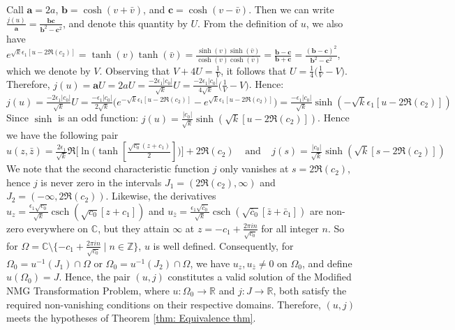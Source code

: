 \documentclass[12pt]{article}
\theoremstyle{plain}
\theoremstyle{definition}
\theoremstyle{remark}
\begin{document}
 Call \(\mathbf{a} = 2a\), \(\mathbf{b} = \cosh(v + \bar{v})\), and \(\mathbf{c} = \cosh(v - \bar{v})\). Then we can write \(\tfrac{j(u)}{\mathbf{a}} = \tfrac{\mathbf{b}\mathbf{c}}{\mathbf{b}^2 - \mathbf{c}^2}\), and denote this quantity by \(U\). From the definition of \(u\), we also have \(e^{\sqrt{k}\epsilon_1[u - 2\Re(c_2)]} = \tanh(v)\tanh(\bar{v}) = \tfrac{\sinh(v)\sinh(\bar{v})}{\cosh(v)\cosh(\bar{v})} = \tfrac{\mathbf{b} - \mathbf{c}}{\mathbf{b} + \mathbf{c}} = \tfrac{(\mathbf{b} - \mathbf{c})^2}{\mathbf{b}^2 - \mathbf{c}^2}\), which we denote by \(V\). Observing that \(V + 4U = \tfrac{1}{V}\), it follows that \(U = \tfrac{1}{4}\big(\tfrac{1}{V} - V\big)\). Therefore, \(j(u) = \mathbf{a}U = 2aU = \tfrac{-2\epsilon_1|c_0|}{\sqrt{k}}U = \tfrac{-2\epsilon_1|c_0|}{4\sqrt{k}}\big(\tfrac{1}{V} - V\big)\). Hence:
 \[
   j(u)=\tfrac{-2\epsilon_1|c_0|}{\sqrt{k}}U=\tfrac{-\epsilon_1|c_0|}{2\sqrt{k}}\big(e^{-\sqrt k\epsilon_1[u-2\Re(c_2)]}-e^{\sqrt k\epsilon_1[u-2\Re(c_2)]}\big)=\tfrac{-\epsilon_1|c_0|}{\sqrt{k}}\sinh(-\sqrt k\epsilon_1[u-2\Re(c_2)])
 \]
 Since \(\sinh\) is an odd function: \(j(u)=\tfrac{|c_0|}{\sqrt{k}}\sinh(\sqrt k[u-2\Re(c_2)])\). Hence we have the following pair
 \[
 \boxed{u(z,\bar z)=\tfrac{2\epsilon_1}{\sqrt{k}} \Re\Big[\ln\big(\tanh[\tfrac{\sqrt{c_0}(z + c_1)}{2}]\big)\Big] + 2\Re(c_2)}\;\;\;\;\text{and}\;\;\;\;\boxed{j(s)=\tfrac{|c_0|}{\sqrt{k}}\sinh(\sqrt k[s-2\Re(c_2)])}
 \]
 We note that the second characteristic function $j$ only vanishes at $s=2\Re(c_2)$, hence $j$ is never zero in the intervals $J_1=(2\Re(c_2),\infty)$ and $J_2=(-\infty, 2\Re(c_2))$. Likewise, the derivatives $u_z=\tfrac{\epsilon_1 \sqrt{c_0}}{\sqrt{k}} \operatorname{csch}(\sqrt{c_0}[z + c_1])$ and $u_{\bar{z}} = \tfrac{\epsilon_1 \sqrt{\bar{c}_0}}{\sqrt{k}} \operatorname{csch}(\sqrt{\bar{c}_0}[\bar{z} + \bar{c}_1])$ are non-zero everywhere on $\mathbb{C}$, but they attain $\infty$ at $z=-c_1+\tfrac{2\pi i n}{\sqrt{c_0}}$ for all integer $n$. So for $\Omega=\mathbb{C}\setminus\{-c_1+\tfrac{2\pi i n}{\sqrt{c_0}} \mid n\in\mathbb{Z}\}$, $u$ is well defined. Consequently, for $\Omega_0 = u^{-1}(J_1)\cap\Omega$ or $\Omega_0 = u^{-1}(J_2)\cap\Omega$, we have $u_z, u_{\bar{z}} \neq 0$ on $\Omega_0$, and define $u(\Omega_0) = J$. Hence, the pair $(u, j)$ constitutes a valid solution of the Modified NMG Transformation Problem, where $u : \Omega_0 \to \mathbb{R}$ and $j : J \to \mathbb{R}$, both satisfy the required non-vanishing conditions on their respective domains. Therefore, $(u, j)$ meets the hypotheses of Theorem \ref{thm: Equivalence thm}.
\end{document}
